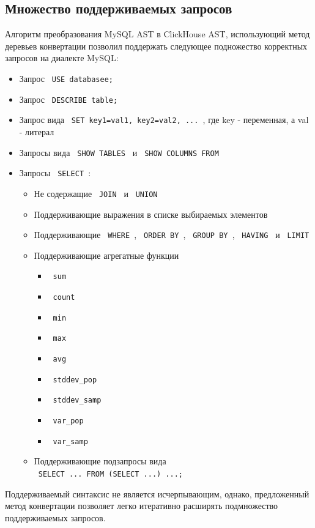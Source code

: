\subsection{Множество поддерживаемых запросов} \label{part:queries}
Алгоритм преобразования MySQL AST в ClickHouse AST, использующий метод деревьев конвертации позволил поддержать следующее подножество корректных запросов на диалекте MySQL:
\begin{itemize}
    \item Запрос \texttt{ USE databasee; }
    \item Запрос \texttt{ DESCRIBE table; }
    \item Запрос вида \texttt{ SET key1=val1, key2=val2, ... }, где key - переменная, а val - литерал
    \item Запросы вида \texttt{ SHOW TABLES } и \texttt{ SHOW COLUMNS FROM }
    \item Запросы \texttt{ SELECT }:
    \begin{itemize}
        \item Не содержащие \texttt{ JOIN } и \texttt{ UNION }
        \item Поддерживающие выражения в списке выбираемых элементов
        \item Поддерживающие \texttt{ WHERE }, \texttt{ ORDER BY }, \texttt{ GROUP BY }, \texttt{ HAVING } и \texttt{ LIMIT }
        \item Поддерживающие агрегатные функции 
        \begin{itemize}
            \item \texttt{ sum }
            \item \texttt{ count }
            \item \texttt{ min }
            \item \texttt{ max }
            \item \texttt{ avg }
            \item \texttt{ stddev_pop}
            \item \texttt{ stddev_samp }
            \item \texttt{ var_pop }
            \item \texttt{ var_samp }
        \end{itemize}
        \item Поддерживающие подзапросы вида \\ \texttt{ SELECT ... FROM (SELECT ...) ...; }
    \end{itemize}
\end{itemize}

Поддерживаемый синтаксис не является исчерпывающим, однако, предложенный метод конвертации позволяет легко итеративно расширять подмножество поддерживаемых запросов.

